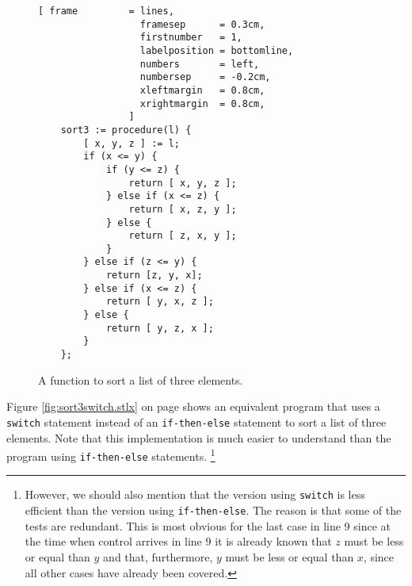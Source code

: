 \begin{figure}[!ht]
\centering
\begin{Verbatim}[ frame         = lines, 
                  framesep      = 0.3cm, 
                  firstnumber   = 1,
                  labelposition = bottomline,
                  numbers       = left,
                  numbersep     = -0.2cm,
                  xleftmargin   = 0.8cm,
                  xrightmargin  = 0.8cm,
                ]
    sort3 := procedure(l) {
        [ x, y, z ] := l;
        if (x <= y) {
            if (y <= z) {
                return [ x, y, z ];
            } else if (x <= z) { 
                return [ x, z, y ];
            } else {
                return [ z, x, y ];
            }
        } else if (z <= y) { 
            return [z, y, x];
        } else if (x <= z) { 
            return [ y, x, z ];
        } else {
            return [ y, z, x ];
        }
    };
\end{Verbatim}
\vspace*{-0.3cm}
\caption{A function to sort a list of three elements.}
\label{fig:sort3.stlx}
\end{figure}

Figure \ref{fig:sort3switch.stlx} on page \pageref{fig:sort3switch.stlx} 
shows an equivalent program that uses a \texttt{switch} statement instead of an
\texttt{if-then-else} statement to sort a list of three elements.  Note that this implementation is
much easier to understand than the program using \texttt{if-then-else} statements.  
\footnote{
However, we should also mention that the version using \texttt{switch} is less efficient than the 
version using \texttt{if-then-else}.  The reason is that some of the tests are redundant.  This is most obvious for the
last case in line 9 since at the time when control arrives in line 9 it is already known that $z$ must be
less or equal than $y$ and that, furthermore, $y$ must be less or equal than $x$, since all other
cases have already been covered.}

